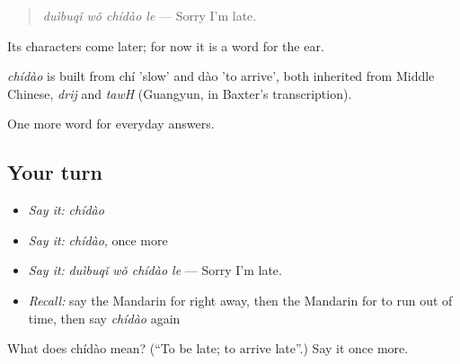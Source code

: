 \begin{quote}
\emph{duìbuqǐ wǒ chídào le} — Sorry I'm late.
\end{quote}

Its characters come later; for now it is a word for the ear.

\begin{cousinweb}
\emph{chídào} is built from chí 'slow' and dào 'to arrive', both inherited from Middle Chinese, \emph{drij} and \emph{tawH} (Guangyun, in Baxter's transcription).
\end{cousinweb}

\begin{grammarlens}[title={What you've built}]
One more word for everyday answers.
\end{grammarlens}

\subsection*{Your turn}
\begin{itemize}
\raggedright
  \item \emph{Say it:} \emph{chídào}
  \item \emph{Say it:} \emph{chídào}, once more
  \item \emph{Say it:} \emph{duìbuqǐ wǒ chídào le} — Sorry I'm late.
  \item \emph{Recall:} say the Mandarin for right away, then the Mandarin for to run out of time, then say \emph{chídào} again
\end{itemize}

\begin{tcolorbox}[breakable,colback=teal!4,colframe=teal!35!black,title={Before you move on}]
What does chídào mean? (\textquotedblleft{}To be late; to arrive late\textquotedblright{}.) Say it once more.
\end{tcolorbox}
